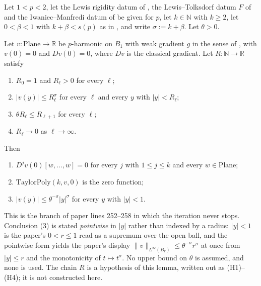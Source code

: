 \begin{lemma}
Let $1<p<2$, let the Lewis rigidity datum of , the
Lewis--Tolksdorf datum $F$ of  and the Iwaniec--Manfredi datum
of  be given for $p$, let $k\in\mathbb{N}$ with $k\ge2$, let
$0<\beta<1$ with $k+\beta<s(p)$ as in , and write $\sigma:=k+\beta$.  Let
$\theta>0$.

Let $v\colon\mathrm{Plane}\to\mathbb{R}$ be $p$-harmonic on $B_1$ with weak gradient $g$ in the
sense of , with $v(0)=0$ and $Dv(0)=0$, where $Dv$ is the classical gradient.
Let $R\colon\mathbb{N}\to\mathbb{R}$ satisfy
\begin{enumerate}
\item[(H1)] $R_0=1$ and $R_\ell>0$ for every $\ell$;
\item[(H2)] $\lvert v(y)\rvert\le R_\ell^{\sigma}$ for every $\ell$ and every $y$ with
  $\lvert y\rvert<R_\ell$;
\item[(H3)] $\theta R_\ell\le R_{\ell+1}$ for every $\ell$;
\item[(H4)] $R_\ell\to0$ as $\ell\to\infty$.
\end{enumerate}
Then
\begin{enumerate}
\item $D^{j}v(0)[w,\ldots,w]=0$ for every $j$ with $1\le j\le k$ and every
  $w\in\mathrm{Plane}$;
\item $\mathrm{TaylorPoly}(k,v,0)$ is the zero function;
\item $\lvert v(y)\rvert\le\theta^{-\sigma}\lvert y\rvert^{\sigma}$ for every $y$ with
  $\lvert y\rvert<1$.
\end{enumerate}

This is the branch of paper lines 252--258 in which the iteration never stops.  Conclusion (3)
is stated \emph{pointwise} in $\lvert y\rvert$ rather than indexed by a radius: $\lvert
y\rvert<1$ is the paper's $0<r\le1$ read as a supremum over the open ball, and the pointwise
form yields the paper's display $\lVert v\rVert_{L^{\infty}(B_r)}\le\theta^{-\sigma}r^{\sigma}$
at once from $\lvert y\rvert\le r$ and the monotonicity of $t\mapsto t^{\sigma}$.  No upper
bound on $\theta$ is assumed, and none is used.  The chain $R$ is a hypothesis of this lemma,
written out as (H1)--(H4); it is not constructed here.
\end{lemma}
